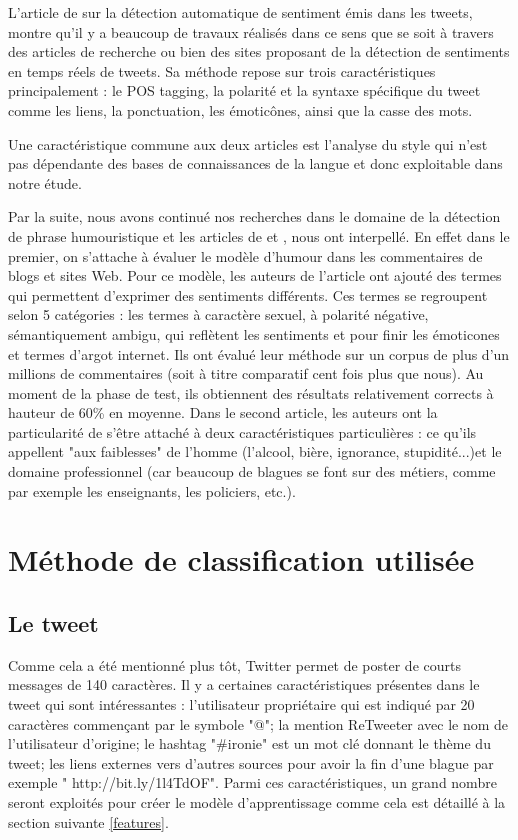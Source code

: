 \documentclass[10pt,a4paper,twoside]{article}
\begin{document}
L’article de \cite{Barbosa2010} sur la détection automatique de sentiment émis dans les tweets, montre qu’il y a beaucoup de travaux réalisés dans ce sens que se soit à travers des articles de recherche ou bien des sites proposant de la détection de sentiments en temps réels de tweets.  Sa méthode repose sur trois caractéristiques principalement : le POS tagging, la polarité et la syntaxe spécifique du tweet comme les liens, la ponctuation, les émoticônes, ainsi que la casse des mots. 

Une caractéristique commune aux deux articles est l’analyse du style qui n’est pas dépendante des bases de connaissances de la langue et donc exploitable dans notre étude. 

Par la suite, nous avons continué nos recherches dans le domaine de la détection de phrase humouristique et les articles de \cite{ReyesPRS10}  et \cite{MihalceaP07}, nous ont interpellé. En effet dans le premier, on s'attache à évaluer le modèle d'humour dans les commentaires de blogs et sites Web. Pour ce modèle, les auteurs de l'article ont ajouté des termes qui permettent d'exprimer des sentiments différents. Ces termes se regroupent selon 5 catégories : les termes à caractère sexuel, à polarité négative, sémantiquement ambigu, qui reflètent les sentiments et pour finir les émoticones et termes d'argot internet. Ils ont évalué leur méthode sur un corpus de plus d'un millions de commentaires (soit à titre comparatif cent fois plus que nous). Au moment de la phase de test, ils obtiennent des résultats relativement corrects à hauteur de 60\% en moyenne. Dans le second article, les auteurs ont la particularité de s'être attaché à deux caractéristiques particulières : ce qu'ils appellent "aux faiblesses" de l'homme (l'alcool, bière, ignorance, stupidité...)et le domaine professionnel (car beaucoup de blagues se font sur des métiers, comme par exemple les enseignants, les policiers, etc.).

\section{Méthode de classification utilisée}
\label{methClass}
\subsection{Le tweet} 
Comme cela a été mentionné plus tôt, Twitter permet de poster de courts messages de 140 caractères. Il y a certaines caractéristiques présentes dans le tweet qui sont intéressantes : l'utilisateur propriétaire qui est indiqué par 20 caractères commençant par le symbole "@"; la mention ReTweeter avec le nom de l'utilisateur d'origine; le hashtag "\#ironie" est un mot clé donnant le thème du tweet; les liens externes vers d'autres sources pour avoir la fin d'une blague par exemple " http://bit.ly/1l4TdOF". Parmi ces caractéristiques, un grand nombre seront exploités pour créer le modèle d'apprentissage comme cela est détaillé à la section suivante \ref{features}.
\end{document}
